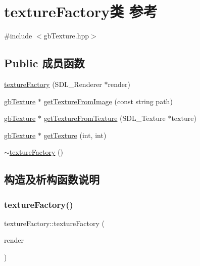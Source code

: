\hypertarget{classtexture_factory}{}\section{texture\+Factory类 参考}
\label{classtexture_factory}


{\ttfamily \#include $<$gb\+Texture.\+hpp$>$}

\subsection*{Public 成员函数}
\begin{DoxyCompactItemize}
\item 
\mbox{\hyperlink{classtexture_factory_a9a981ff49cb841ebb0f6d2dde449f6c2}{texture\+Factory}} (S\+D\+L\+\_\+\+Renderer $\ast$render)
\item 
\mbox{\hyperlink{classgb_texture}{gb\+Texture}} $\ast$ \mbox{\hyperlink{classtexture_factory_ab14e97fdc012fd7b6642c5792c8f379c}{get\+Texture\+From\+Image}} (const string path)
\item 
\mbox{\hyperlink{classgb_texture}{gb\+Texture}} $\ast$ \mbox{\hyperlink{classtexture_factory_ab531da926bf210ac07e6493261dd3c53}{get\+Texture\+From\+Texture}} (S\+D\+L\+\_\+\+Texture $\ast$texture)
\item 
\mbox{\hyperlink{classgb_texture}{gb\+Texture}} $\ast$ \mbox{\hyperlink{classtexture_factory_a580ab219f0b06a37795bb64b1a070f1a}{get\+Texture}} (int, int)
\item 
\mbox{\hyperlink{classtexture_factory_a01827b2a02d25ec80e72bffb142e4b5a}{$\sim$texture\+Factory}} ()
\end{DoxyCompactItemize}


\subsection{构造及析构函数说明}
\mbox{\label{classtexture_factory_a9a981ff49cb841ebb0f6d2dde449f6c2}} 
\subsubsection{\texorpdfstring{textureFactory()}{textureFactory()}}
{\footnotesize\ttfamily texture\+Factory\+::texture\+Factory (\begin{DoxyParamCaption}\item[{S\+D\+L\+\_\+\+Renderer $\ast$}]{render }\end{DoxyParamCaption})}


